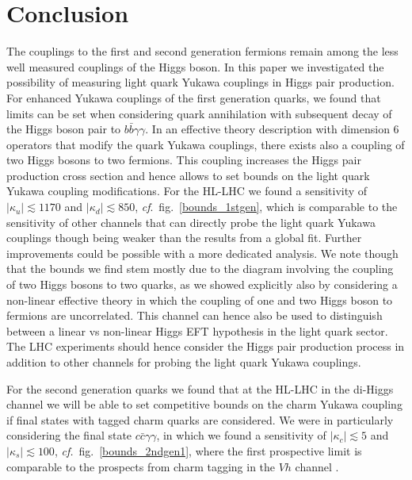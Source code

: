 \section{Conclusion \label{sec:conclusion}}
The couplings to the first and second generation fermions remain among the less well measured couplings of the Higgs boson.
In this paper we investigated the possibility of measuring light quark Yukawa couplings in Higgs pair production.
For enhanced Yukawa couplings of the first generation quarks, we found that limits can be set when considering
quark annihilation with subsequent decay of the Higgs boson pair to $b\bar{b}\gamma\gamma$. In an effective theory description with dimension 6 operators that modify the quark Yukawa couplings,
there exists also a coupling of two Higgs bosons to two fermions. This coupling increases the Higgs pair production cross section and hence allows to set bounds on the light quark Yukawa coupling modifications.
For the HL-LHC we found a sensitivity of $|\kappa_u| \lesssim 1170 $ and $|\kappa_d| \lesssim 850 $, \textit{cf}.~fig.~\ref{bounds_1stgen}, which is comparable to the sensitivity of other channels that can directly probe the light quark Yukawa couplings though being weaker than the results from a global fit. Further improvements could be possible with a more dedicated analysis.
We note though that the bounds we find stem mostly
due to the diagram involving the coupling of two Higgs bosons to two quarks, as we showed explicitly also by considering a non-linear effective
theory in which the coupling of one and two Higgs boson to fermions are uncorrelated.
This channel can hence also be used to distinguish between a linear vs non-linear Higgs EFT hypothesis in the light quark sector.
The LHC experiments should hence consider the Higgs pair production process in addition to other channels for probing the light quark Yukawa couplings.
\par
For the second generation quarks we found that at the HL-LHC in the di-Higgs channel we will be able to set competitive bounds on the
charm Yukawa coupling if final states with tagged charm quarks are considered.
We were in particularly considering the final state $c\bar{c}\gamma\gamma$, in which we found a sensitivity of $|\kappa_c| \lesssim 5$ and $|\kappa_s | \lesssim 100 $, \textit{cf.}~fig.~\ref{bounds_2ndgen1}, where the first prospective limit is comparable to the prospects from charm tagging in the $Vh$ channel \cite{Perez:2015lra}.


